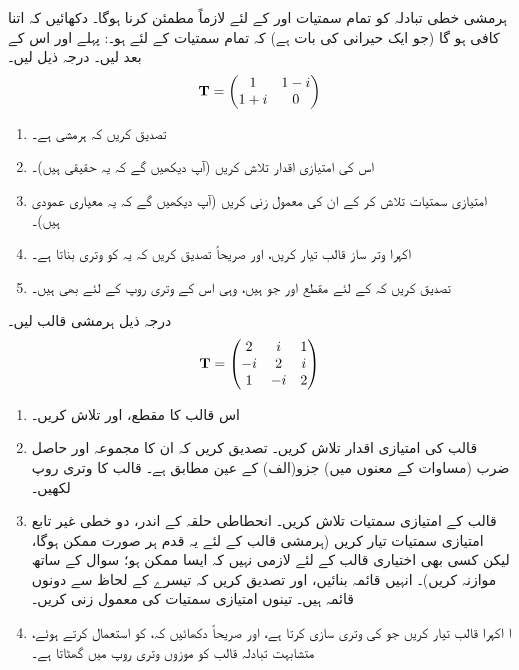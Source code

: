 ہرمشی خطی تبادلہ کو تمام سمتیات  اور  کے لئے لازماً  مطمئن کرنا ہوگا۔ دکھائیں کہ اتنا  کافی ہو گا  (جو ایک حیرانی کی بات ہے)   کہ تمام سمتیات  کے لئے  ہو۔: پہلے  اور اس کے بعد  لیں۔ 
درجہ ذیل لیں۔
\begin{align*}
	\operatorname{\mathbf{T}}=
	\begin{pmatrix}
		1 & 1-i\\
		1+i & 0
	\end{pmatrix}
\end{align*}
\begin{enumerate}[a]
\item
 تصدیق کریں کہ  ہرمشی ہے۔
\item
 اس کی امتیازی اقدار تلاش کریں (آپ دیکھیں گے کہ یہ حقیقی ہیں)۔
\item
 امتیازی سمتیات تلاش کر کے ان کی معمول زنی کریں  (آپ دیکھیں گے کہ یہ معیاری عمودی ہیں)۔
\item
 اکہرا وتر ساز  قالب  تیار کریں،  اور صریحاً تصدیق کریں کہ یہ  کو وتری بناتا ہے۔
\item
 تصدیق کریں کہ  کے لئے مقطع  اور    جو ہیں، وہی  اس کے وتری روپ کے لئے بھی ہیں۔
 \end{enumerate}
درجہ ذیل ہرمشی قالب لیں۔
\begin{align*}
	\operatorname{\mathbf{T}}=
	\begin{pmatrix}
		2 & i & 1\\
		-i & 2 & i\\
		1 & -i & 2
	\end{pmatrix}
\end{align*}
\begin{enumerate}[a]
\item
 اس قالب کا مقطع،   اور   تلاش کریں۔
\item
 قالب  کی امتیازی اقدار تلاش کریں۔ تصدیق کریں کہ ان کا مجموعہ اور حاصل ضرب  (مساوات    کے معنوں میں) جزو(الف) کے عین مطابق ہے۔ قالب  کا  وتری روپ  لکھیں۔
\item
 قالب  کے امتیازی سمتیات تلاش کریں۔ انحطاطی  حلقہ  کے اندر،   دو خطی غیر تابع امتیازی سمتیات تیار کریں (ہرمشی قالب کے لئے یہ قدم ہر صورت ممکن ہوگا،  لیکن کسی بھی اختیاری قالب کے لئے لازمی نہیں کہ ایسا ممکن ہو؛  سوال   کے ساتھ موازنہ کریں)۔ انہیں قائمہ بنائیں،  اور تصدیق کریں کہ تیسرے کے لحاظ سے دونوں قائمہ ہیں۔ تینوں امتیازی سمتیات کی معمول زنی کریں۔
\item
ا   اکہرا قالب  تیار کریں جو   کی وتری سازی کرتا ہے،  اور صریحاً دکھائیں کہ،    کو استعمال کرتے ہوئے،  متشابہت تبادلہ قالب   کو موزوں  وتری روپ میں گھٹاتا ہے۔
 \end{enumerate}
